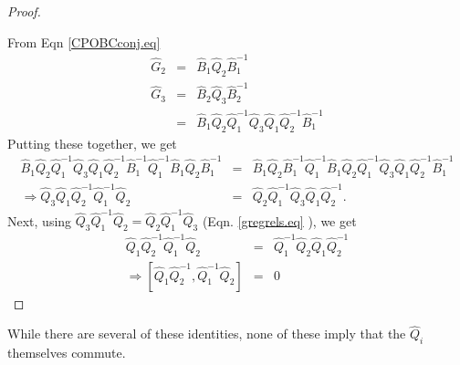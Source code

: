 \documentclass[11pt]{article}
\newcommand{\hQ}{\hat Q}
\newcommand*{\drawprobarrow}[4][]{%
  \draw[prob arrow] (#2)-- node[sloped,midway, below, #1] {$#3$} (#4);
}
\newcommand*{\drawprobrighttop}[4][]{%
  \draw[prob arrow] (#2)-- node[right=0.2,midway, #1] {$#3$} (#4);
}
\newcommand*{\drawproblefttop}[4][]{%
  \draw[prob arrow] (#2)-- node[left=0.2,midway, #1] {$#3$} (#4);
  }
\newcommand{\h}{\hat}
\begin{document}
\begin{proof}
\begin{center}
\end{center} 
From Eqn \eqref{CPOBCconj.eq} 
\begin{eqnarray}
\h G_2&=&\h B_1 \h Q_2\h B_1^{-1}     \nonumber \\
\h G_3&=& \h B_2\h Q_3\h B_2^{-1}     \nonumber \\
&=& \h B_1\h Q_2\h Q_1^{-1}\h Q_3\h Q_1\h Q_2^{-1}\h B_1^{-1}
\end{eqnarray}
Putting these together, we get
\begin{eqnarray}
 \h B_1\h Q_2\h Q_1^{-1}\h Q_3\h Q_1\h Q_2^{-1}\h B_1^{-1}\h Q_1^{-1}\h B_1 \h Q_2\h B_1^{-1}&=&\h B_1 \h Q_2\h B_1^{-1}\h Q_1^{-1}\h B_1\h Q_2\h Q_1^{-1}\h Q_3\h Q_1\h Q_2^{-1}\h B_1^{-1}\nonumber \\
 \Rightarrow \h Q_3\h Q_1\h Q_2^{-1}\h Q_1^{-1}\h Q_2&=&\h Q_2\h
                                                         Q_1^{-1}\h
                                                         Q_3\hQ_1\hQ_2^{-1}. 
\end{eqnarray}
Next, using $\h Q_3\h Q_1^{-1}\h Q_2=\h Q_2\h Q_1^{-1}\hQ_3$
(Eqn. \eqref{gregrels.eq} ), we get  
\begin{eqnarray} 
\hQ_1\hQ_2^{-1}\hQ_1^{-1}\hQ_2 &=& \hQ_1^{-1}\hQ_2\hQ_1\hQ_2^{-1}
                                   \nonumber \\ 
\Rightarrow [\h Q_1\h Q_2^{-1},\h Q_1^{-1}\h Q_2]&=&0 \label{qoneqtwo.eq}
\end{eqnarray} 
\end{proof}

While there are several of these identities,  none of these imply that
the $\hQ_i$ themselves commute.  
\end{document}
